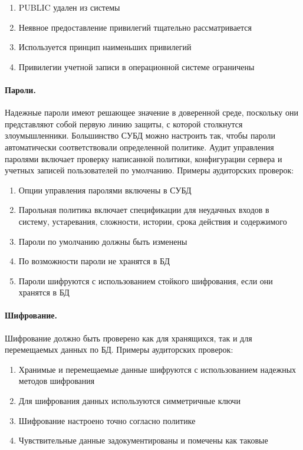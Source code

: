 \begin{enumerate}
	\item PUBLIC удален из системы
	\item Неявное предоставление привилегий тщательно рассматривается
	\item Используется принцип наименьших привилегий
	\item Привилегии учетной записи в операционной системе ограничены
\end{enumerate}

\paragraph{Пароли.}

Надежные пароли имеют решающее значение в доверенной среде, поскольку они представляют собой первую линию защиты, с которой столкнутся злоумышленники. Большинство СУБД можно настроить так, чтобы пароли автоматически соответствовали определенной политике. Аудит управления паролями включает проверку написанной политики, конфигурации сервера и учетных записей пользователей по умолчанию. Примеры аудиторских проверок:

\begin{enumerate}
	\item Опции управления паролями включены в СУБД
	\item Парольная политика включает спецификации для неудачных входов в систему, устаревания, сложности, истории, срока действия и содержимого
	\item Пароли по умолчанию должны быть изменены
	\item По возможности пароли не хранятся в БД
	\item Пароли шифруются с использованием стойкого шифрования, если они хранятся в БД
\end{enumerate}

\paragraph{Шифрование.}

Шифрование должно быть проверено как для хранящихся, так и для перемещаемых данных по БД. Примеры аудиторских проверок:

\begin{enumerate}
	\item Хранимые и перемещаемые данные шифруются с использованием надежных методов шифрования
	\item Для шифрования данных используются симметричные ключи
	\item Шифрование настроено точно согласно политике
	\item Чувствительные данные задокументированы и помечены как таковые
\end{enumerate}

